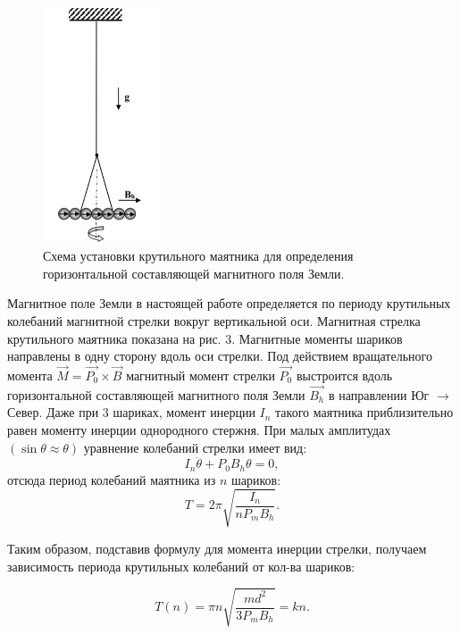 \documentclass[a4paper, 14pt]{extarticle}%
\newcommand\ECaption[1]{%
     \captionsetup{font=footnotesize}%
     \caption{#1}}
\begin{document}
\begin{figure}
\begin{center}
\includegraphics[height=7cm]{pics/krut.png}
\end{center}
\ECaption{Схема установки крутильного маятника для определения горизонтальной составляющей магнитного поля Земли.}
\end{figure}


Магнитное поле Земли в настоящей работе определяется по периоду крутильных колебаний
магнитной стрелки вокруг вертикальной оси. 
Магнитная стрелка крутильного маятника показана на рис. 3.
 Магнитные моменты шариков направлены в одну
сторону вдоль оси стрелки. Под действием вращательного
момента $\vec{M} = \vec{P_0} \times\vec{B}$ магнитный момент стрелки $\vec{P_0}$ выстроится вдоль горизонтальной составляющей магнитного поля Земли $\vec{B_h}$ в направлении Юг $\longrightarrow$ Север. 
Даже при 3 шариках, момент инерции $I_n$ такого маятника приблизительно равен моменту инерции однородного стержня. При малых амплитудах $(\sin\theta\approx\theta)$ уравнение колебаний стрелки имеет вид:
\[I_n\ddot{\theta} + P_0B_h\theta=0,\]
отсюда период колебаний маятника из $n$ шариков:
\[T = 2\pi\sqrt{\frac{I_n}{nP_mB_h}}.\]

Таким образом, подставив формулу для момента инерции стрелки, получаем  зависимость периода крутильных колебаний от кол-ва шариков:

\begin{equation}
T(n) = \pi n\sqrt{\frac{md^2}{3P_mB_h}} = kn.
\end{equation}
\end{document}
